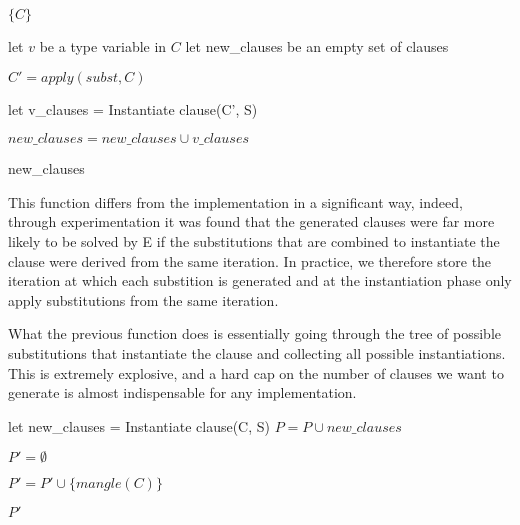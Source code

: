 \documentclass{article}
\begin{document}
\begin{algorithm}[tbh]
\begin{algorithmic}[1]


      \State \Return \(\{C\}\)

   \Else

      \State let \(v\) be a type variable in \(C\)
      \State let new\_clauses be an empty set of clauses



            \State \(C' = apply(subst, C)\)

            \State let v\_clauses = Instantiate clause(C', S)

         \EndIf

         \State \( new\_clauses = new\_clauses \cup v\_clauses\)

      \EndFor

      \State \Return new\_clauses
   \EndIf

\EndFunction
\end{algorithmic}
\end{algorithm}
This function differs from the implementation in a significant way, indeed, through experimentation it was found that the generated clauses were far more likely to be solved by E if the substitutions that are combined to instantiate the clause were derived from the same iteration. In practice, we therefore store the iteration at which each substition is generated and at the instantiation phase only apply substitutions from the same iteration.


What the previous function does is essentially going through the tree of possible substitutions that instantiate the clause and collecting all possible instantiations. This is extremely explosive, and a hard cap on the number of clauses we want to generate is almost indispensable for any implementation.

\begin{algorithm}[tbh]
\begin{algorithmic}[1]

   \State let new\_clauses = Instantiate clause(C, S)
   \State \(P = P \cup new\_clauses\)
\EndFor

\State \(P' = \emptyset \)

      \State \(P' = P' \cup \{mangle(C)\}\)
   \EndIf
\EndFor

\State \Return \(P'\)

\EndFunction
\end{algorithmic}
\end{algorithm}
\end{document}
